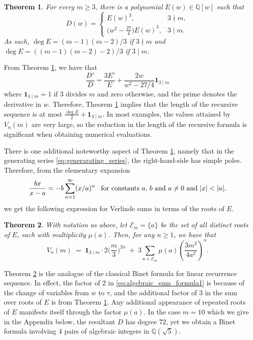 \documentclass[11pt,reqno]{amsart}
\newtheorem{theorem}{Theorem}[section]
\theoremstyle{remark}
\begin{document}
\begin{theorem}
\label{thm:cube_first}
For every $m\ge3$, there is a polynomial $E(w) \in \mathbb{Q}[w]$ such that
\[
D(w) = \begin{cases}E(w)^3, & 3\nmid m,\\ \big(w^2-\tfrac{27}{4}\big)E(w)^3, & 3\mid m.\end{cases}
\]
As such, $\deg E = (m-1)(m-2)/3$ if $3\nmid m$ and $\deg E = ((m-1)(m-2)-2)/3$ if $3\mid m$.
\end{theorem}

From Theorem \ref{thm:cube_first}, we have that
$$
\frac{D'}{D} = \frac{3E'}{E} + \frac{2w}{w^{2}-27/4} \mathbf 1_{3\mid m}
$$
where $\mathbf 1_{3\mid m} = 1$ if $3$ divides $m$ and zero otherwise, and the prime denotes the derivative in $w$. Therefore,
Theorem \ref{thm:cube_first} implies that the length of the recursive sequence is at
most $\frac{\deg E}{2} + \mathbf 1_{3\mid m}$.
In most examples, the values attained by $V_{n}(m)$ are very large, so the reduction
in the length of the recursive formula is significant when obtaining numerical evaluations.

There is one additional noteworthy aspect of Theorem \ref{thm:cube_first}, namely that in the generating series
\eqref{eq:generarating_series}, the right-hand-side has simple poles.
Therefore, from the elementary expansion
$$
\frac{bx}{x-a} = -b\sum\limits_{n=1}^{\infty}(x/a)^{n}
\,\,\,\,\,
\textrm{\rm for constants $a, \, b$ and $a\neq 0$ and  $|x|<|a|$},
$$
we get the following expression for Verlinde sums in terms of the roots of $E$.

\begin{theorem}
\label{thm:algebraic_sum} With notation as above, let $\mathcal{E}_{m} = \{a\}$ be the set of all distinct roots of $E$, each with multiplicity
$\mu(a)$.  Then, for any $n \geq 1$, we have that
\begin{equation}\label{eq:algebraic_sum_formula1}
V_n(m) \;=\; \mathbf 1_{3\mid m}\cdot 2\Big(\frac{m}{3}\Big)^{2n} \;+\; 3\sum_{a \in \mathcal{E}_m}
\mu(a)\left(\frac{3m^2}{4a^2}\right)^{\!n}.
\end{equation}
\end{theorem}

Theorem \ref{thm:algebraic_sum} is the analogue of the classical Binet formula for linear recurrence sequence.
In effect, the factor of $2$ in \eqref{eq:algebraic_sum_formula1} is because of the change of variables
from $w$ to $\tau$, and the additional factor of $3$ in the sum over roots of $E$ is from Theorem \ref{thm:cube_first}.
Any additional appearance of repeated roots of $E$ manifests itself through the factor $\mu(a)$. In the case
$m=10$ which we give in the Appendix below, the resultant $D$ has degree $72$, yet we obtain a Binet formula involving $4$ pairs of algebraic
integers in $\mathbb{Q}(\sqrt{5})$.
\end{document}

